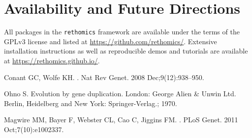 \documentclass[10pt,letterpaper]{article}
\begin{document}

\section*{Availability and Future Directions}
All packages in the \texttt{rethomics} framework are available under the terms of the GPLv3 license and listed at  		\href{https://github.com/rethomics}{https://github.com/rethomics/}.
Extensive installation instructions as well as reproducible demos and tutorials are available at
\href{https://rethomics.github.io/}{https://rethomics.github.io/}.


\nolinenumbers

%
%
% 
\begin{thebibliography}{10}

Conant GC, Wolfe KH.
.
\newblock Nat Rev Genet. 2008 Dec;9(12):938--950.

Ohno S.
\newblock Evolution by gene duplication.
\newblock London: George Alien \& Unwin Ltd. Berlin, Heidelberg and New York:
  Springer-Verlag.; 1970.

Magwire MM, Bayer F, Webster CL, Cao C, Jiggins FM.
.
\newblock PLoS Genet. 2011 Oct;7(10):e1002337.

\end{thebibliography}
\end{document}
